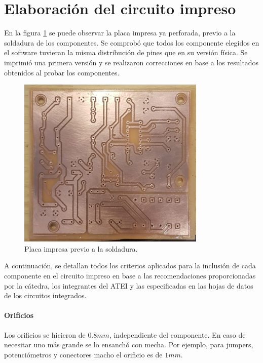 \section{Elaboración del circuito impreso}

En la figura \ref{fig:pcb-implementada} se puede observar la placa impresa ya perforada,
previo a la soldadura de los componentes.
Se comprobó que todos los componente elegidos en el software tuvieran la misma distribución de pines que en su versión física. 
Se imprimió una primera versión y se realizaron correcciones en base a los resultados obtenidos al probar los componentes. \cite{pcb-atei}

\begin{figure}[H]
    \centering
    \includegraphics[width=0.8\textwidth]{images/pcb-implementada.jpeg}
    \caption{Placa impresa previo a la soldadura.}
    \label{fig:pcb-implementada}
\end{figure}

A continuación, se detallan todos los criterios aplicados para la inclusión de cada componente en el circuito impreso en base a las recomendaciones 
proporcionadas por la cátedra, los integrantes del ATEI y las especificadas en las hojas de datos de los circuitos integrados.

\paragraph{Orificios}

Los orificios se hicieron de $0.8mm$, independiente del componente. En caso de necesitar uno más grande se lo ensanchó con mecha.
Por ejemplo, para jumpers, potenciómetros y conectores macho el orificio es de $1mm$. 

